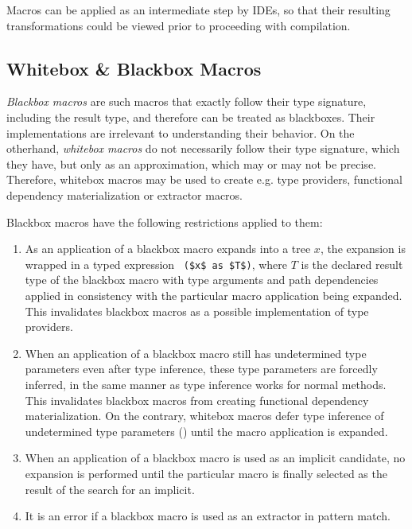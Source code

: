 Macros can be applied as an intermediate step by IDEs, so that their resulting transformations could be viewed prior to proceeding with compilation. 





\subsection{Whitebox \& Blackbox Macros}
\label{sec:whitebox-blackbox-macros}

{\em Blackbox macros} are such macros that exactly follow their type signature, including the result type, and therefore can be treated as blackboxes. Their implementations are irrelevant to understanding their behavior. On the otherhand, {\em whitebox macros} do not necessarily follow their type signature, which they have, but only as an approximation, which may or may not be precise. Therefore, whitebox macros may be used to create e.g. type providers, functional dependency materialization or extractor macros. 

Blackbox macros have the following restrictions applied to them:
\begin{enumerate}
  \item As an application of a blackbox macro expands into a tree $x$, the expansion is wrapped in a typed expression ~\lstinline!($x$ as $T$)!, where $T$ is the declared result type of the blackbox macro with type arguments and path dependencies applied in consistency with the particular macro application being expanded. This invalidates blackbox macros as a possible implementation of type providers. 
  \item When an application of a blackbox macro still has undetermined type parameters even after type inference, these type parameters are forcedly inferred, in the same manner as type inference works for normal methods. This invalidates blackbox macros from creating functional dependency materialization. On the contrary, whitebox macros defer type inference of undetermined type parameters () until the macro application is expanded. 
  \item When an application of a blackbox macro is used as an implicit candidate, no expansion is performed until the particular macro is finally selected as the result of the search for an implicit. 
  \item It is an error if a blackbox macro is used as an extractor in pattern match. 
\end{enumerate}






